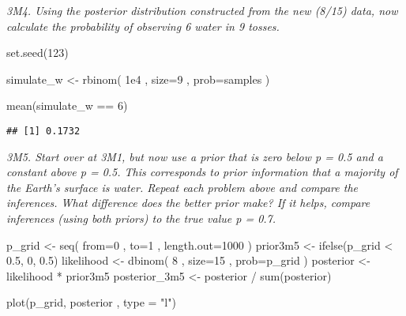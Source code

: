 \documentclass[
]{book}
\newenvironment{Shaded}{\begin{snugshade}}{\end{snugshade}}
\newcommand{\AttributeTok}[1]{\textcolor[rgb]{0.77,0.63,0.00}{#1}}
\newcommand{\DecValTok}[1]{\textcolor[rgb]{0.00,0.00,0.81}{#1}}
\newcommand{\FloatTok}[1]{\textcolor[rgb]{0.00,0.00,0.81}{#1}}
\newcommand{\FunctionTok}[1]{\textcolor[rgb]{0.00,0.00,0.00}{#1}}
\newcommand{\NormalTok}[1]{#1}
\newcommand{\OtherTok}[1]{\textcolor[rgb]{0.56,0.35,0.01}{#1}}
\newcommand{\SpecialCharTok}[1]{\textcolor[rgb]{0.00,0.00,0.00}{#1}}
\newcommand{\StringTok}[1]{\textcolor[rgb]{0.31,0.60,0.02}{#1}}
\begin{document}
\emph{3M4. Using the posterior distribution constructed from the new (8/15) data, now calculate the probability of observing 6 water in 9 tosses.}

\begin{Shaded}
\begin{Highlighting}[]
\FunctionTok{set.seed}\NormalTok{(}\DecValTok{123}\NormalTok{)}

\NormalTok{simulate\_w }\OtherTok{\textless{}{-}} \FunctionTok{rbinom}\NormalTok{( }\FloatTok{1e4}\NormalTok{ , }\AttributeTok{size=}\DecValTok{9}\NormalTok{ , }\AttributeTok{prob=}\NormalTok{samples )}

\FunctionTok{mean}\NormalTok{(simulate\_w }\SpecialCharTok{==} \DecValTok{6}\NormalTok{)}
\end{Highlighting}
\end{Shaded}

\begin{verbatim}
## [1] 0.1732
\end{verbatim}

\emph{3M5. Start over at 3M1, but now use a prior that is zero below p = 0.5 and a constant above p = 0.5. This corresponds to prior information that a majority of the Earth's surface is water. Repeat each problem above and compare the inferences. What difference does the better prior make? If it helps, compare inferences (using both priors) to the true value p = 0.7.}

\begin{Shaded}
\begin{Highlighting}[]
\NormalTok{p\_grid }\OtherTok{\textless{}{-}} \FunctionTok{seq}\NormalTok{( }\AttributeTok{from=}\DecValTok{0}\NormalTok{ , }\AttributeTok{to=}\DecValTok{1}\NormalTok{ , }\AttributeTok{length.out=}\DecValTok{1000}\NormalTok{ )}
\NormalTok{prior3m5 }\OtherTok{\textless{}{-}} \FunctionTok{ifelse}\NormalTok{(p\_grid }\SpecialCharTok{\textless{}} \FloatTok{0.5}\NormalTok{, }\DecValTok{0}\NormalTok{, }\FloatTok{0.5}\NormalTok{)}
\NormalTok{likelihood }\OtherTok{\textless{}{-}} \FunctionTok{dbinom}\NormalTok{( }\DecValTok{8}\NormalTok{ , }\AttributeTok{size=}\DecValTok{15}\NormalTok{ , }\AttributeTok{prob=}\NormalTok{p\_grid )}
\NormalTok{posterior }\OtherTok{\textless{}{-}}\NormalTok{ likelihood }\SpecialCharTok{*}\NormalTok{ prior3m5}
\NormalTok{posterior\_3m5 }\OtherTok{\textless{}{-}}\NormalTok{ posterior }\SpecialCharTok{/} \FunctionTok{sum}\NormalTok{(posterior)}

\FunctionTok{plot}\NormalTok{(p\_grid, posterior , }\AttributeTok{type =} \StringTok{"l"}\NormalTok{)}
\end{Highlighting}
\end{Shaded}
\end{document}

